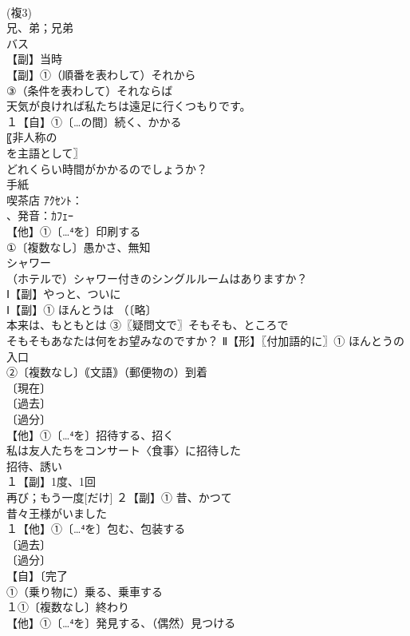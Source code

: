 \documentclass[8pt]{extreport}
\begin{document}
\begin{CJK}{UTF8}{min}
\\	(複3)
\\	兄、弟；兄弟
\\	バス 
\\	【副】当時
\\	【副】①（順番を表わして）それから
\\	③（条件を表わして）それならば 
\\	天気が良ければ私たちは遠足に行くつもりです。
\\	１【自】①〔…の間〕続く、かかる
\\	〖非人称の
\\	を主語として〗
\\	どれくらい時間がかかるのでしょうか？
\\	手紙 
\\	喫茶店 ｱｸｾﾝﾄ：
\\	、発音：ｶﾌｪｰ
\\	【他】①〔…⁴を〕印刷する
\\	①〔複数なし〕愚かさ、無知
\\	シャワー
\\	（ホテルで）シャワー付きのシングルルームはありますか？
\\	Ⅰ【副】やっと、ついに
\\	Ⅰ【副】① ほんとうは （〔略〕
\\	本来は、もともとは ③〖疑問文で〗そもそも、ところで 
\\	そもそもあなたは何をお望みなのですか？ Ⅱ【形】〖付加語的に〗① ほんとうの
\\	入口 
\\	②〔複数なし〕｟文語｠（郵便物の）到着
\\	〔現在〕
\\	〔過去〕
\\	〔過分〕
\\	【他】①〔…⁴を〕招待する、招く
\\	私は友人たちをコンサート〈食事〉に招待した 
\\	招待、誘い
\\	１【副】1度、1回
\\	再び；もう一度[だけ] ２【副】① 昔、かつて 
\\	昔々王様がいました
\\	１【他】①〔…⁴を〕包む、包装する
\\	〔過去〕
\\	〔過分〕
\\	【自】〔完了
\\	①（乗り物に）乗る、乗車する
\\	１①〔複数なし〕終わり
\\	【他】①〔…⁴を〕発見する、（偶然）見つける

\end{CJK}
\end{document}

